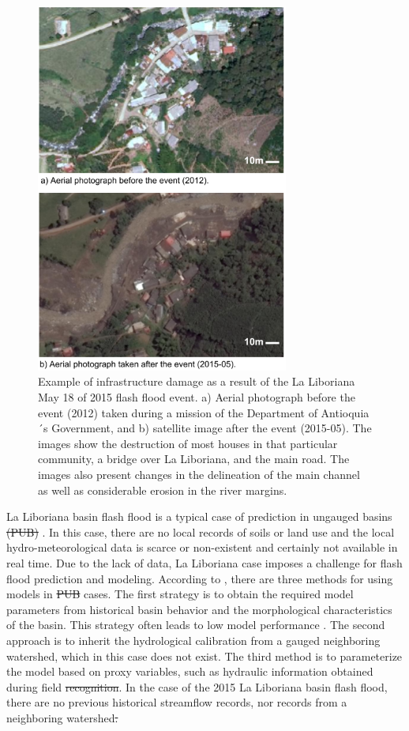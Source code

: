 \documentclass[hess, manuscript]{copernicus} %
\providecommand{\DIFadd}[1]{{\protect\color{blue}\uwave{#1}}} %
\providecommand{\DIFdel}[1]{{\protect\color{red}\sout{#1}}}                      %
\providecommand{\DIFaddbegin}{} %
\providecommand{\DIFaddend}{} %
\providecommand{\DIFdelbegin}{} %
\providecommand{\DIFdelend}{} %
\begin{document}
\begin{figure}[t]
    \centering
    \includegraphics[width=8.3cm]{Figures/Salgar_Before_After.png}
    \caption{Example of infrastructure damage as a result of the La Liboriana May 18 of 2015 flash flood event. a) Aerial photograph before the event (2012) taken during a mission of the Department of Antioquia´s Government, and b) satellite image after the event (2015-05). The images show the destruction of most houses in that particular community, a bridge over La Liboriana, and the main road. The images also present changes in the delineation of the main channel as well as considerable erosion in the river margins.}
    \label{fig:Antes_y_Despues}
\end{figure}

La Liboriana basin flash flood is a typical case of prediction in ungauged basins  \DIFdelbegin \DIFdel{(PUB) }\DIFdelend \citep{Sivapalan2013, Seibert2009, Beven2007, Bonell2006, Yamanaka2017}.  In this case,  there are no local records of soils or land use and the local hydro-meteorological data is scarce or non-existent and certainly not available in real time. Due to the lack of data, La Liboriana case imposes a challenge for flash flood prediction and modeling. According to \citet{blschl2012}, there are three methods for using models in \DIFdelbegin \DIFdel{PUB }\DIFdelend \DIFaddbegin \DIFadd{these }\DIFaddend cases. The first strategy is to obtain the required model parameters from historical basin behavior and the morphological characteristics of the basin. This strategy often leads to low model performance \citep{Duan2006}. The second approach is to inherit the hydrological calibration from a gauged neighboring watershed, which in this case does not exist. The third method is to parameterize the model based on proxy variables, such as hydraulic information obtained during field \DIFdelbegin \DIFdel{recognition}\DIFdelend \DIFaddbegin \DIFadd{visits}\DIFaddend . In the case of the 2015 La Liboriana basin flash flood, there are no previous historical streamflow records, nor records from a neighboring watershed\DIFdelbegin \DIFdel{.}%
\end{document}
